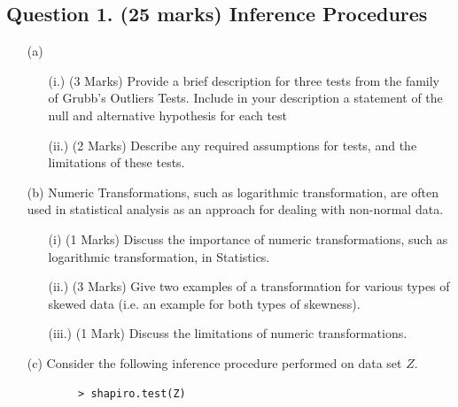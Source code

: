 \documentclass[a4paper,12pt]{article}
\begin{document}
\subsection*{Question 1. (25 marks) Inference Procedures}
	
\begin{itemize}

\item[(a)]

\begin{itemize}
	\item[(i.)] (3 Marks) Provide a brief description for three tests from the family of Grubb's  Outliers Tests. Include in your description a statement of the null and alternative hypothesis for each test
	\item[(ii.)] (2 Marks) Describe any required assumptions for tests, and the limitations of these tests.
\end{itemize}



%

\item[(b)]
Numeric Transformations, such as logarithmic transformation, are often used in statistical analysis as an approach for dealing with non-normal data.
\begin{itemize}
	\item[(i)] (1 Marks) Discuss the importance of numeric transformations, such as logarithmic transformation, in Statistics.
	\item[(ii.)] (3 Marks) Give two examples of a transformation for various types of skewed data (i.e. an example for both types of skewness).
	\item[(iii.)] (1 Mark) Discuss the limitations of numeric transformations.
\end{itemize}

	\item[(c)]
Consider the following inference procedure performed on data set $Z$.
\begin{center}
	\begin{framed}
		\begin{verbatim}
		> shapiro.test(Z)
		

\end{verbatim}
\end{framed}
\end{center}
\end{itemize}
\end{document}
